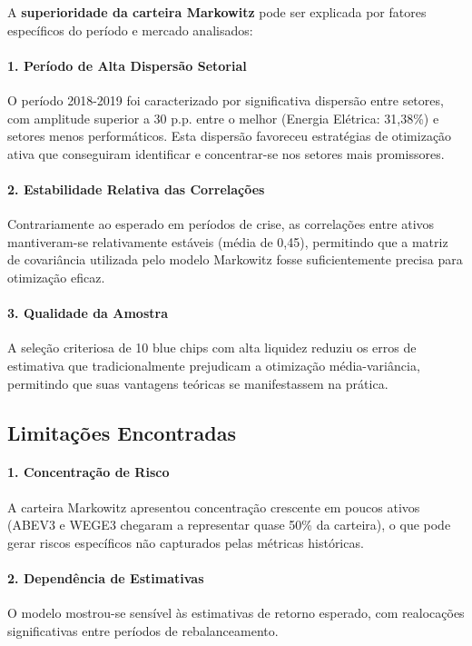 A \textbf{superioridade da carteira Markowitz} pode ser explicada por fatores específicos do período e mercado analisados:

\paragraph{1. Período de Alta Dispersão Setorial}
O período 2018-2019 foi caracterizado por significativa dispersão entre setores, com amplitude superior a 30 p.p. entre o melhor (Energia Elétrica: 31,38\%) e setores menos performáticos. Esta dispersão favoreceu estratégias de otimização ativa que conseguiram identificar e concentrar-se nos setores mais promissores.

\paragraph{2. Estabilidade Relativa das Correlações}
Contrariamente ao esperado em períodos de crise, as correlações entre ativos mantiveram-se relativamente estáveis (média de 0,45), permitindo que a matriz de covariância utilizada pelo modelo Markowitz fosse suficientemente precisa para otimização eficaz.

\paragraph{3. Qualidade da Amostra}
A seleção criteriosa de 10 blue chips com alta liquidez reduziu os erros de estimativa que tradicionalmente prejudicam a otimização média-variância, permitindo que suas vantagens teóricas se manifestassem na prática.

\subsection{Limitações Encontradas}

\paragraph{1. Concentração de Risco}
A carteira Markowitz apresentou concentração crescente em poucos ativos (ABEV3 e WEGE3 chegaram a representar quase 50\% da carteira), o que pode gerar riscos específicos não capturados pelas métricas históricas.

\paragraph{2. Dependência de Estimativas}
O modelo mostrou-se sensível às estimativas de retorno esperado, com realocações significativas entre períodos de rebalanceamento.

